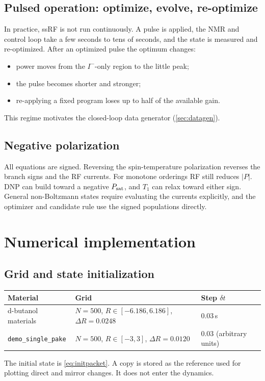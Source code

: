 \documentclass[11pt]{article}
\newcommand{\Iminus}{I^{-}}
\newcommand{\code}[1]{\texttt{#1}}
\begin{document}
\subsection{Pulsed operation: optimize, evolve, re-optimize}

In practice, ssRF is not run continuously. A pulse is applied, the NMR and control loop take a few
seconds to tens of seconds, and the state is measured and re-optimized. After an optimized pulse
the optimum changes:
\begin{itemize}
\item power moves from the \(\Iminus\)-only region to the little peak;
\item the pulse becomes shorter and stronger;
\item re-applying a fixed program loses up to half of the available gain.
\end{itemize}
This regime motivates the closed-loop data generator (\cref{sec:datagen}).

\subsection{Negative polarization}

All equations are signed. Reversing the spin-temperature polarization reverses the branch signs
and the RF currents. For monotone orderings RF still reduces \(|P|\). DNP can build toward a
negative \(P_{\rm sat}\), and \(T_1\) can relax toward either sign. General non-Boltzmann states
require evaluating the currents explicitly, and the optimizer and candidate rule use the signed
populations directly.

\section{Numerical implementation}
\label{sec:numerics}

\subsection{Grid and state initialization}

\begin{center}
\begin{tabular}{lll}
\toprule
Material & Grid & Step \(\delta t\) \\
\midrule
d-butanol materials & \(N=500\), \(R\in[-6.186,6.186]\), \(\Delta R=0.0248\) & \(0.03\)\,s \\
\code{demo\_single\_pake} & \(N=500\), \(R\in[-3,3]\), \(\Delta R=0.0120\) & \(0.03\) (arbitrary units) \\
\bottomrule
\end{tabular}
\end{center}
The initial state is \cref{eq:initpacket}. A copy is stored as the reference used for plotting
direct and mirror changes. It does not enter the dynamics.
\end{document}
